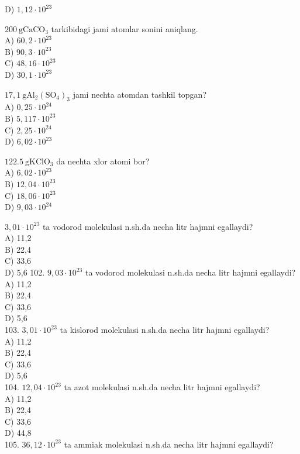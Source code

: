 D) $1,12 \cdot 10^{23}$
  \item $200 \mathrm{~g} \mathrm{CaCO}_{3}$ tarkibidagi jami atomlar sonini aniqlang.\\
A) $60,2 \cdot 10^{23}$\\
B) $90,3 \cdot 10^{23}$\\
C) $48,16 \cdot 10^{23}$\\
D) $30,1 \cdot 10^{23}$
  \item $17,1 \mathrm{~g} \mathrm{Al}_{2}\left(\mathrm{SO}_{4}\right)_{3}$ jami nechta atomdan tashkil topgan?\\
A) $0,25 \cdot 10^{24}$\\
B) $5,117 \cdot 10^{23}$\\
C) $2,25 \cdot 10^{24}$\\
D) $6,02 \cdot 10^{23}$
  \item $122.5 \mathrm{~g} \mathrm{KClO}_{3}$ da nechta xlor atomi bor?\\
A) $6,02 \cdot 10^{23}$\\
B) $12,04 \cdot 10^{23}$\\
C) $18,06 \cdot 10^{23}$\\
D) $9,03 \cdot 10^{24}$
  \item $3,01 \cdot 10^{23}$ ta vodorod molekulasi n.sh.da necha litr hajmni egallaydi?\\
A) 11,2\\
B) 22,4\\
C) 33,6\\
D) 5,6
102. $9,03 \cdot 10^{23}$ ta vodorod molekulasi n.sh.da necha litr hajmni egallaydi?\\
A) 11,2\\
B) 22,4\\
C) 33,6\\
D) 5,6\\
103. $3,01 \cdot 10^{23}$ ta kislorod molekulasi n.sh.da necha litr hajmni egallaydi?\\
A) 11,2\\
B) 22,4\\
C) 33,6\\
D) 5,6\\
104. $12,04 \cdot 10^{23}$ ta azot molekulasi n.sh.da necha litr hajmni egallaydi?\\
A) 11,2\\
B) 22,4\\
C) 33,6\\
D) 44,8\\
105. $36,12 \cdot 10^{23}$ ta ammiak molekulasi n.sh.da necha litr hajmni egallaydi?\\
